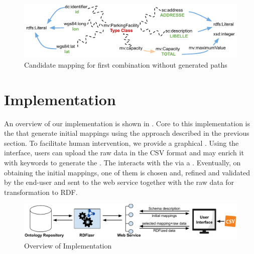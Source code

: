 



\begin{figure}
	\centering
	\includegraphics[scale=0.4]{images/combinationNoPath.pdf}
	\caption{Candidate mapping for first combination without generated paths}
	\label{fig:combinationNoPath}
\end{figure}

\section{Implementation}\label{sec:implementation}
An overview of our implementation is shown in . Core to this implementation is the  that generate initial mappings using the approach described in the previous section. To facilitate human intervention,
we provide a graphical . Using the interface, users can upload the raw data in the CSV format and may enrich it with keywords to generate the . The  interacts with the  via a . Eventually, on obtaining the initial mappings, one of them is chosen and, refined and validated by the end-user and sent to the web service together with the raw data for transformation to RDF.

\begin{figure}[h]
	\centering
	\includegraphics[scale=0.55]{images/OverviewImplementation.pdf}
	\caption{Overview of Implementation}
	\label{fig:OverviewImplementation}
\end{figure}

